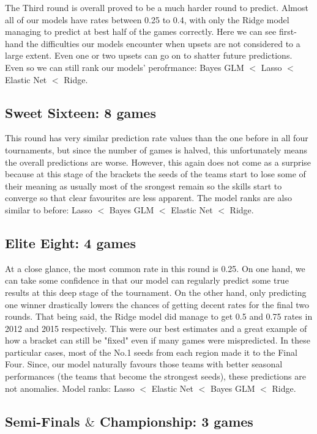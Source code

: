 \documentclass{article} %
\begin{document}
The Third round is overall proved to be a much harder round to predict. Almost all of our models have rates between 0.25 to 0.4, with only the Ridge model managing to predict at best half of the games correctly. Here we can see first-hand the difficulties our models encounter when upsets are not considered to a large extent. Even one or two upsets can go on to shatter future predictions. Even so we can still rank our models' perofrmance: Bayes GLM $<$ Lasso $<$ Elastic Net $<$ Ridge.

\subsection{Sweet Sixteen: 8 games}

This round has very similar prediction rate values than the one before in all four tournaments, but since the number of games is halved, this unfortunately means the overall predictions are worse. However, this again does not come as a surprise because at this stage of the brackets the seeds of the teams start to lose some of their meaning as usually most of the srongest remain so the skills start to converge so that clear favourites are less apparent. The model ranks are also similar to before: Lasso $<$ Bayes GLM $<$ Elastic Net $<$ Ridge.   

\subsection{Elite Eight: 4 games}

At a close glance, the most common rate in this round is 0.25. On one hand, we can take some confidence in that our model can regularly predict some true results at this deep stage of the tournament. On the other hand, only predicting one winner drastically lowers the chances of getting decent rates for the final two rounds. That being said, the Ridge model did manage to get 0.5 and 0.75 rates in 2012 and 2015 respectively. This were our best estimates and a great example of how a bracket can still be "fixed" even if many games were mispredicted. In these particular cases, most of the No.1 seeds from each region made it to the Final Four. Since, our model naturally favours those teams with better seasonal performances (the teams that become the strongest seeds), these predictions are not anomalies. Model ranks: Lasso  $<$ Elastic Net $<$ Bayes GLM $<$ Ridge.  

\subsection{Semi-Finals $\&$ Championship: 3 games}
\end{document}
